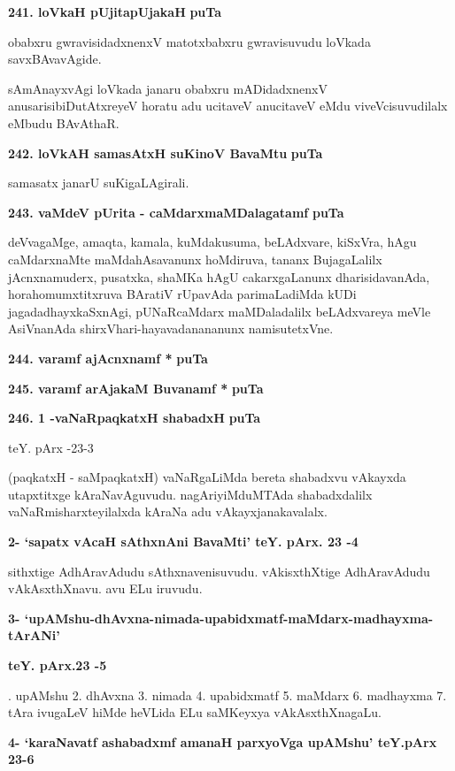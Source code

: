\medskip
\noindent
\textbf{241. loVkaH pUjitapUjakaH} \hfill{\bf puTa \pageref{183}}

\smallskip
obabxru gwravisidadxnenxV matotxbabxru gwravisuvudu loVkada savxBAvavAgide.

sAmAnayxvAgi loVkada janaru obabxru mADidadxnenxV anusarisibiDutAtxreyeV horatu adu ucitaveV anucitaveV eMdu viveVcisuvudilalx eMbudu BAvAthaR.

\medskip
\noindent
\textbf{242. loVkAH samasAtxH suKinoV BavaMtu} \hfill{\bf puTa \pageref{47}}

\smallskip
samasatx janarU suKigaLAgirali.

\medskip
\noindent
\textbf{243. vaMdeV pUrita - caMdarxmaMDalagatamf} \hfill{\bf puTa \pageref{102}}

\smallskip
deVvagaMge, amaqta, kamala, kuMdakusuma, beLAdxvare, kiSxVra, hAgu caMdarxnaMte maMdahAsa\-vanunx hoMdiruva, tananx BujagaLalilx jAcnxnamuderx, pusatxka, shaMKa hAgU cakarxgaLanunx dharisidavanAda, hora\-homumxtitxruva BAratiV rUpavAda parimaLadiMda kUDi jagadadhayxkaSxnAgi, pUNaRcaMdarx maMDaladalilx beLAdxvareya meVle AsiVnanAda shirxVhari-hayavadanananunx namisutetxVne.

\medskip
\noindent
\textbf{244. varamf ajAcnxnamf *} \hfill{\bf puTa \pageref{94}}

\medskip
\noindent
\textbf{245. varamf arAjakaM Buvanamf *} \hfill{\bf puTa \pageref{94}}

\medskip
\noindent
\textbf{246. 1 -vaNaRpaqkatxH shabadxH} \hfill{\bf puTa \pageref{153}}

\hfill{teY. pArx -23-3}

\smallskip
(paqkatxH - saMpaqkatxH) vaNaRgaLiMda bereta shabadxvu vAkayxda utapxtitxge kAraNavAgu\-vudu. nagAri\-yiMduM\-TAda shabadxdalilx vaNaRmisharxteyilalxda kAraNa adu vAkayxjanakavalalx.

\medskip
\noindent
\textbf{2- `sapatx vAcaH sAthxnAni BavaMti' teY. pArx. 23 -4}

\smallskip
sithxtige AdhAravAdudu sAthxnavenisuvudu. vAkisxthXtige AdhAravAdudu vAkAsxthXnavu. avu ELu iru\-vudu.


\medskip
\noindent
\textbf{3- `upAMshu-dhAvxna-nimada-upabidxmatf-maMdarx-madhayxma-tArANi'}

\textbf{teY. pArx.23 -5}

. upAMshu 2. dhAvxna 3. nimada 4. upabidxmatf 5. maMdarx 6. madhayxma 7. tAra ivu\-gaLeV hiMde heVLida ELu saMKeyxya vAkAsxthXnagaLu.

\medskip
\noindent
\textbf{4- `karaNavatf ashabadxmf amanaH parxyoVga upAMshu' teY.pArx 23-6}

